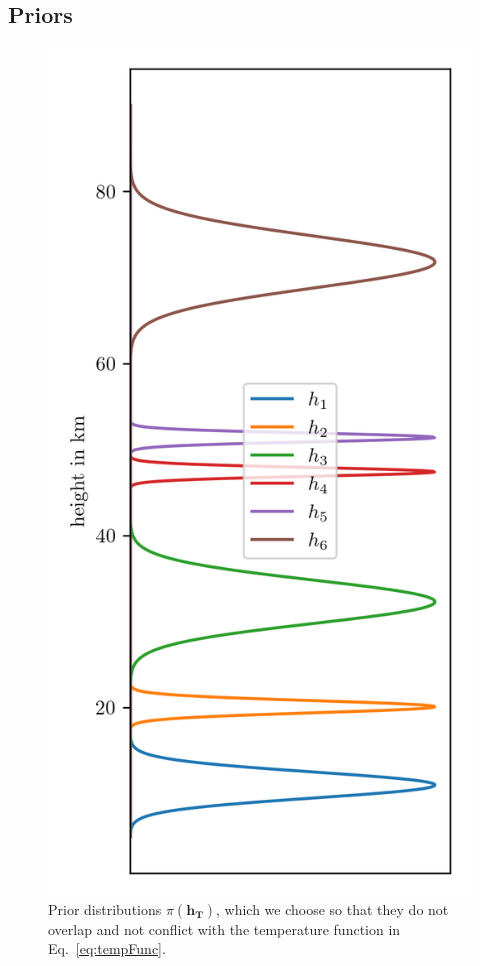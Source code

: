 \subsection{Priors}
\begin{figure}[ht!]
	\centering
	\includegraphics{HeightPriors.png}
	\caption[Prior distributions $\pi(\bm{h_T})$.]{Prior distributions $\pi(\bm{h_T})$, which we choose so that they do not overlap and not conflict with the temperature function in Eq.~\ref{eq:tempFunc}.}
	\label{fig:HeightPriors}
\end{figure} 

